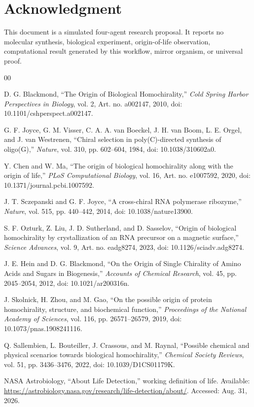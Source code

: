 \documentclass[conference]{IEEEtran}
\begin{document}
\section*{Acknowledgment}

This document is a simulated four-agent research proposal. It reports no molecular synthesis, biological experiment, origin-of-life observation, computational result generated by this workflow, mirror organism, or universal proof.

\begin{thebibliography}{00}

 D. G. Blackmond, ``The Origin of Biological Homochirality,'' \emph{Cold Spring Harbor Perspectives in Biology}, vol. 2, Art. no. a002147, 2010, doi: 10.1101/cshperspect.a002147.

 G. F. Joyce, G. M. Visser, C. A. A. van Boeckel, J. H. van Boom, L. E. Orgel, and J. van Westrenen, ``Chiral selection in poly(C)-directed synthesis of oligo(G),'' \emph{Nature}, vol. 310, pp. 602--604, 1984, doi: 10.1038/310602a0.

 Y. Chen and W. Ma, ``The origin of biological homochirality along with the origin of life,'' \emph{PLoS Computational Biology}, vol. 16, Art. no. e1007592, 2020, doi: 10.1371/journal.pcbi.1007592.

 J. T. Sczepanski and G. F. Joyce, ``A cross-chiral RNA polymerase ribozyme,'' \emph{Nature}, vol. 515, pp. 440--442, 2014, doi: 10.1038/nature13900.

 S. F. Ozturk, Z. Liu, J. D. Sutherland, and D. Sasselov, ``Origin of biological homochirality by crystallization of an RNA precursor on a magnetic surface,'' \emph{Science Advances}, vol. 9, Art. no. eadg8274, 2023, doi: 10.1126/sciadv.adg8274.

 J. E. Hein and D. G. Blackmond, ``On the Origin of Single Chirality of Amino Acids and Sugars in Biogenesis,'' \emph{Accounts of Chemical Research}, vol. 45, pp. 2045--2054, 2012, doi: 10.1021/ar200316n.

 J. Skolnick, H. Zhou, and M. Gao, ``On the possible origin of protein homochirality, structure, and biochemical function,'' \emph{Proceedings of the National Academy of Sciences}, vol. 116, pp. 26571--26579, 2019, doi: 10.1073/pnas.1908241116.

 Q. Sallembien, L. Bouteiller, J. Crassous, and M. Raynal, ``Possible chemical and physical scenarios towards biological homochirality,'' \emph{Chemical Society Reviews}, vol. 51, pp. 3436--3476, 2022, doi: 10.1039/D1CS01179K.

 NASA Astrobiology, ``About Life Detection,'' working definition of life. Available: \url{https://astrobiology.nasa.gov/research/life-detection/about/}. Accessed: Aug. 31, 2026.

\end{thebibliography}
\end{document}
